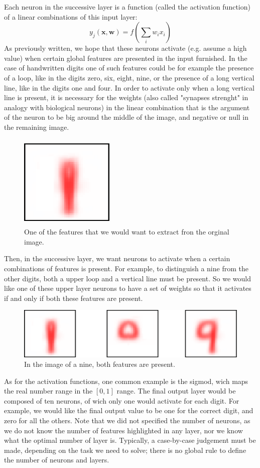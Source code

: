 \documentclass[a4paper]{report}
\begin{document}
Each neuron in the successive layer is a function (called the activation function) of a linear combinations of this input layer:
\begin{equation}
y_j(\textbf{x}, \textbf{w}) = f (\sum_i w_i x_i)
\end{equation}
As previously written, we hope that these neurons activate (e.g. assume a high value) when certain global features are presented in the input furnished. In the case of handwritten digits one of such features could be for example the presence of a loop, like in the digits zero, six, eight, nine, or the presence of a long vertical line, like in the digits one and four. In order to activate only when a long vertical line is present, it is necessary for the weights (also called "synapses strenght" in analogy with biological neurons) in the linear combination that is the argument of the neuron to be big around the middle of the image, and negative or null in the remaining image.
\begin{figure} [H]
\centering
\includegraphics [height=4.5cm ,width=4.5cm ] {o/nine.png}
\caption{One of the features that we would want to extract fron the orginal image.}
\end{figure}
Then, in the successive layer, we want neurons to activate when a certain combinations of features is present. For example, to distinguish a nine from the other digits, both a upper loop and a vertical line must be present. So we would like one of these upper layer neurons to have a set of weights so that it activates if and only if both these features are present.

\begin{figure} [H]
\centering
\includegraphics [width=\textwidth] {o/features.png}
\caption{In the image of a nine, both features are present.}
\end{figure}
As for the activation functions, one common example is the sigmod, wich maps the real number range in the $[0,1]$ range. The final output layer would be composed of ten neurons, of wich only one would activate for each digit. For example, we would like the final output value to be one for the correct digit, and zero for all the others. Note that we did not specified the number of neurons, as we do not know the number of features highlighted in any layer, nor we know what the optimal number of layer is. Typically, a case-by-case judgement must be made, depending on the task we need to solve; there is no global rule to define the number of neurons and layers. 
\end{document}

